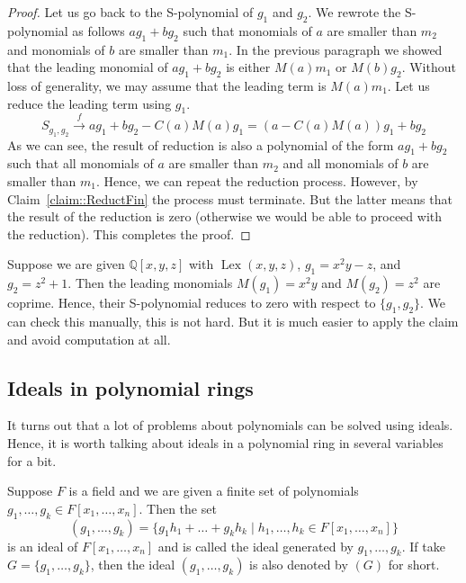 \begin{proof}
Let us go back to the S-polynomial of $g_1$ and $g_2$.
We rewrote the S-polynomial as follows $a g_1 + b g_2$ such that monomials of $a$ are smaller than $m_2$ and monomials of $b$ are smaller than $m_1$.
In the previous paragraph we showed that the leading monomial of $a g_1 + b g_2$ is either $M(a) m_1$ or $M(b) g_2$.
Without loss of generality, we may assume that the leading term is $M(a) m_1$.
Let us reduce the leading term using $g_1$.
\[
S_{g_1, g_2}\stackrel{f}{\longrightarrow} a g_1 + b g_2 - C(a) M(a) g_1 = (a - C(a) M(a)) g_1 + b g_2
\]
As we can see, the result of reduction is also a polynomial of the form $a g_1 + b g_2$ such that all monomials of $a$ are smaller than $m_2$ and all monomials of $b$ are smaller than $m_1$.
Hence, we can repeat the reduction process.
However, by Claim~\ref{claim::ReductFin} the process must terminate.
But the latter means that the result of the reduction is zero (otherwise we would be able to proceed with the reduction).
This completes the proof.
\end{proof}

\begin{example}
Suppose we are given $\mathbb Q[x, y, z]$ with $\operatorname{Lex}(x, y, z)$, $g_1 = x^2 y - z$, and $g_2 = z^2 + 1$.
Then the leading monomials $M(g_1) = x^2 y$ and $M(g_2) = z^2$ are coprime.
Hence, their S-polynomial reduces to zero with respect to $\{g_1,g_2\}$.
We can check this manually, this is not hard.
But it is much easier to apply the claim and avoid computation at all.
\end{example}


\subsection{Ideals in polynomial rings}

It turns out that a lot of problems about polynomials can be solved using ideals.
Hence, it is worth talking about ideals in a polynomial ring in several variables for a bit.

\begin{definition}
Suppose $F$ is a field and we are given a finite set of polynomials $g_1,\ldots,g_k\in F[x_1,\ldots,x_n]$.
Then the set
\[
(g_1,\ldots,g_k) = \{g_1 h_1 + \ldots + g_k h_k\mid h_1,\ldots,h_k\in F[x_1,\ldots,x_n]\}
\]
is an ideal of $F[x_1,\ldots,x_n]$ and is called the ideal generated by $g_1,\ldots,g_k$.
If take $G = \{g_1,\ldots,g_k\}$, then the ideal $(g_1,\ldots,g_k)$ is also denoted by $(G)$ for short.
\end{definition}


